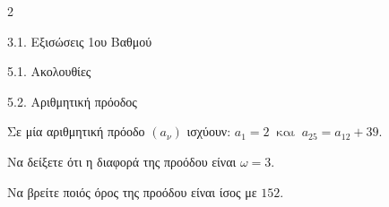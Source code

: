 \begin{ylh}{2}
    \item 3.1. Εξισώσεις 1ου Βαθμού
    \item 5.1. Ακολουθίες
    \item 5.2. Αριθμητική πρόοδος
\end{ylh}
Σε μία αριθμητική πρόοδο $\left( a_{\nu} \right)$ ισχύουν: $a_{1} = 2\ \text{ και }\ a_{25} = a_{12} + 39$.

\begin{alist}
\item Να δείξετε ότι η διαφορά της προόδου είναι $\omega = 3$.
\item Να βρείτε ποιός όρος της προόδου είναι ίσος με $152$.
\end{alist}

